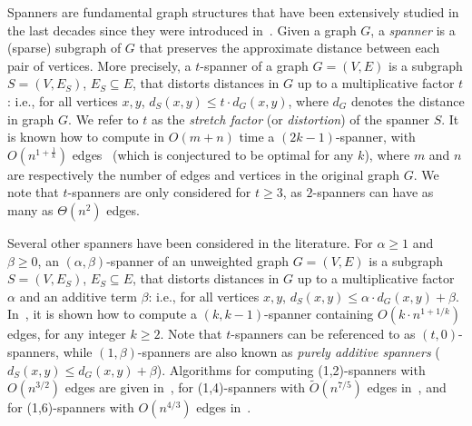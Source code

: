 \documentclass{article}
\begin{document}
Spanners are fundamental graph structures that have been extensively studied in the last decades since they were introduced in~\cite{PS89}.
Given a graph $G$, a \emph{spanner} is a (sparse) subgraph of $G$ that preserves the approximate distance between each pair of vertices.
More precisely, a $t$-spanner of a graph $G=(V,E)$ is a subgraph $S=(V,E_S)$, $E_S\subseteq E$, 
that distorts distances in $G$ up to a multiplicative factor $t$: i.e., for all vertices $x,y$,  
$d_S(x,y)\leq t\cdot d_G(x,y)$, where $d_G$ denotes the distance in graph $G$. We refer to $t$ as the \emph{stretch factor} (or \emph{distortion}) of the spanner $S$. 
It is known how to compute in $O(m+n)$ time a $(2k-1)$-spanner, with $O(n^{1+ \frac{1}{k}})$ edges~\cite{ADDJ93,HZ96} (which is conjectured to be optimal for any $k$),
where $m$ and $n$ are respectively the number of edges and vertices in the original graph $G$.
We note  that $t$-spanners are only considered for $t\geq 3$, as  $2$-spanners 
can have as many as $\Theta(n^2)$ edges.


Several other spanners have been considered in the literature.  
For $\alpha\geq 1$ and $\beta\geq 0$, an $(\alpha,\beta)$-spanner of an unweighted graph $G=(V,E)$ is a subgraph $S=(V,E_S)$, $E_S\subseteq E$, 
that distorts distances in $G$ up to a multiplicative factor $\alpha$ and an additive term $\beta$: i.e., for all vertices $x,y$,  
$d_S(x,y)\leq\alpha\cdot d_G(x,y)+\beta$.
In~\cite{Baswana2010}, it is shown how to compute a $(k,k-1)$-spanner containing $O(k \cdot n^{1+1/k})$ edges, for any integer $k \geq 2$. 
Note that $t$-spanners can be referenced to as $(t,0)$-spanners, while $(1,\beta)$-spanners are also known as \emph{purely additive spanners} ($d_S(x,y)\leq d_G(x,y)+\beta$). Algorithms for computing (1,2)-spanners with $O(n^{3/2})$ edges are given in~\cite{Aingworth,Dor,RodittyAdditive}, for (1,4)-spanners  with $\tilde{O}(n^{7/5})$ 
edges in~\cite{chechik4}, and for (1,6)-spanners with $O(n^{4/3})$ edges in~\cite{Baswana2010}.
\end{document}
